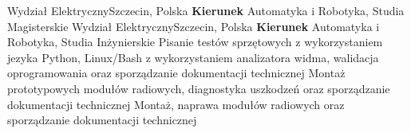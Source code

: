 \documentclass[
    10pt,
    A4,
    polish,
    draft = false,
    twoside = false,
]{article}
\begin{document}
	{Wydział Elektryczny}{Szczecin, Polska}
	{\textbf{Kierunek} Automatyka i Robotyka, Studia Magisterskie}
	{Wydział Elektryczny}{Szczecin, Polska}
	{\textbf{Kierunek} Automatyka i Robotyka, Studia Inżynierskie}
	{Pisanie testów sprzętowych z wykorzystaniem jezyka Python, Linux/Bash z wykorzystaniem analizatora widma, walidacja oprogramowania oraz sporządzanie dokumentacji technicznej}	
	{Montaż prototypowych modułów radiowych, diagnostyka uszkodzeń oraz sporządzanie dokumentacji technicznej} 
	{Montaż, naprawa modułów radiowych oraz sporządzanie dokumentacji technicznej}
\end{document}
